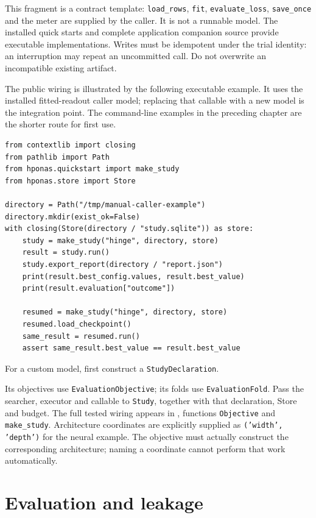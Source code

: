 This fragment is a contract template: \texttt{load\_rows}, \texttt{fit},
\texttt{evaluate\_loss}, \texttt{save\_once} and the meter are supplied by
the caller. It is not a runnable model. The installed quick starts and complete
application companion source provide executable implementations. Writes must
be idempotent under the trial identity: an interruption may repeat an
uncommitted call. Do not overwrite an incompatible existing artifact.

The public wiring is illustrated by the following executable example. It uses
the installed fitted-readout caller model; replacing that callable with a new
model is the integration point. The command-line examples in the preceding
chapter are the shorter route for first use.

\begin{verbatim}
from contextlib import closing
from pathlib import Path
from hponas.quickstart import make_study
from hponas.store import Store

directory = Path("/tmp/manual-caller-example")
directory.mkdir(exist_ok=False)
with closing(Store(directory / "study.sqlite")) as store:
    study = make_study("hinge", directory, store)
    result = study.run()
    study.export_report(directory / "report.json")
    print(result.best_config.values, result.best_value)
    print(result.evaluation["outcome"])

    resumed = make_study("hinge", directory, store)
    resumed.load_checkpoint()
    same_result = resumed.run()
    assert same_result.best_value == result.best_value
\end{verbatim}

For a custom model, first construct a \texttt{StudyDeclaration}.

Its objectives use \texttt{EvaluationObjective}; its folds use
\texttt{EvaluationFold}. Pass the searcher, executor and callable to
\texttt{Study}, together with that declaration, Store and budget.
The full tested wiring appears in
, functions
\texttt{Objective} and \texttt{make\_study}. Architecture coordinates are
explicitly supplied as \texttt{('width', 'depth')} for the neural example.
The objective must actually construct the corresponding architecture; naming
a coordinate cannot perform that work automatically.

\section{Evaluation and leakage}

